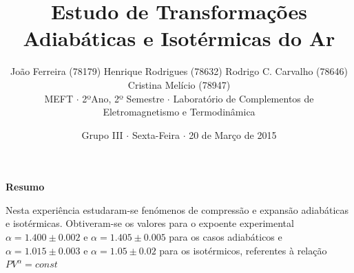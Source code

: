 \documentclass[9pt]{extarticle}
\renewenvironment{abstract}
 {\small
  \begin{center}
  \bfseries \abstractname\vspace{-.5em}\vspace{0pt}
  \end{center}
  \list{}{
    \setlength{\leftmargin}{0cm}%
    \setlength{\rightmargin}{\leftmargin}%
  }%
  \item\relax}
 {\endlist}
\renewcommand{\abstractname}{Resumo}
\begin{document}
\title {\bf \huge Estudo de Transformações Adiabáticas e Isotérmicas do Ar}
\author
{{\small João Ferreira (78179) Henrique Rodrigues (78632) Rodrigo C. Carvalho (78646) Cristina Melício (78947)} \\
{\small MEFT $\cdot$ 2ºAno, 2º Semestre $\cdot$ Laboratório de Complementos de Eletromagnetismo e Termodinâmica}}
\date{{\small Grupo III $\cdot$ Sexta-Feira $\cdot$ 20 de Março de 2015}}
\maketitle

\begin{abstract}
\par Nesta experiência estudaram-se fenómenos de compressão e expansão adiabáticas e isotérmicas. Obtiveram-se os valores para o expoente experimental $\alpha=1.400\pm0.002$ e $\alpha=1.405\pm0.005$ para os casos adiabáticos e  $\alpha=1.015\pm0.003$ e $\alpha=1.05\pm0.02$ para os isotérmicos, referentes à relação $PV^{\alpha}=const$
\end{abstract}
\end{document}
